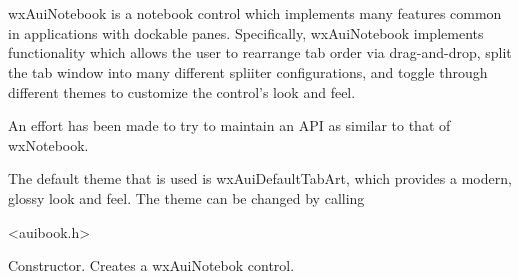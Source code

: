 %
%


\section{}\label{wxauinotebook}


wxAuiNotebook is a notebook control which implements many features common in applications with dockable panes.  Specifically, wxAuiNotebook implements functionality which allows the user to rearrange tab order via drag-and-drop, split the tab window into many different spliiter configurations, and toggle through different themes to customize the control's look and feel.



An effort has been made to try to maintain an API as similar to that of wxNotebook.

The default theme that is used is wxAuiDefaultTabArt, which provides a modern, glossy look and feel.  The theme can be changed by calling 





<auibook.h>




\label{wxauinotebookwxauinotebook}




Constructor.  Creates a wxAuiNotebok control.

\label{wxauinotebookdtor}



\label{wxauinotebookaddpage}



